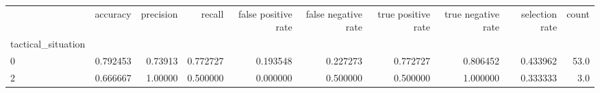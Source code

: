 \begin{tabular}{lrrrrrrrrr}
\toprule
{} &  accuracy &  precision &    recall &  false positive rate &  false negative rate &  true positive rate &  true negative rate &  selection rate &  count \\
tactical\_situation &           &            &           &                      &                      &                     &                     &                 &        \\
\midrule
0                  &  0.792453 &    0.73913 &  0.772727 &             0.193548 &             0.227273 &            0.772727 &            0.806452 &        0.433962 &   53.0 \\
2                  &  0.666667 &    1.00000 &  0.500000 &             0.000000 &             0.500000 &            0.500000 &            1.000000 &        0.333333 &    3.0 \\
\bottomrule
\end{tabular}
